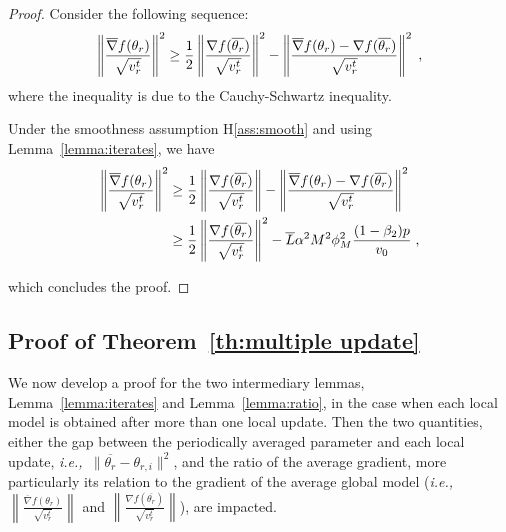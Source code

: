 \documentclass[11pt]{article}
\newcommand{\eqsp}{\;}
\newcommand{\beq}{\begin{equation}}
\newcommand{\eeq}{\end{equation}}
\newcommand{\ie}{{\em i.e.,~}}
\begin{document}
\begin{proof}
Consider the following sequence:
\beq\notag
\begin{split}
\left\| \frac{\overline{\nabla}f(\theta_r)}{\sqrt{ v_r^t}} \right\|^2 \geq \frac{1}{2} \left\| \frac{\nabla f(\overline{\theta_r})}{\sqrt{ v_r^t}} \right\|^2 - \left\| \frac{\overline{\nabla}f(\theta_r)- \nabla f(\overline{\theta_r})}{\sqrt{ v_r^t}} \right\|^2 \eqsp,
\end{split}
\eeq
where the inequality is due to the Cauchy-Schwartz inequality.

Under the smoothness assumption H\ref{ass:smooth} and using Lemma~\ref{lemma:iterates}, we have
\beq\notag
\begin{split}
\left\| \frac{\overline{\nabla}f(\theta_r)}{\sqrt{ v_r^t}} \right\|^2 & \geq \frac{1}{2} \left\| \frac{\nabla f(\overline{\theta_r})}{\sqrt{ v_r^t}} \right\| - \left\| \frac{\overline{\nabla}f(\theta_r)- \nabla f(\overline{\theta_r})}{\sqrt{ v_r^t}} \right\|^2\\
& \geq \frac{1}{2} \left\| \frac{\nabla f(\overline{\theta_r})}{\sqrt{ v_r^t}} \right\|^2 - \overline{L} \alpha^2 M^2 \phi_M^2 \frac{(1-\beta_2)p}{v_0} \eqsp,
\end{split}
\eeq

which concludes the proof.
\end{proof}



\subsection{Proof of Theorem~\ref{th:multiple update}} \label{app:proofmain}



We now develop a proof for the two intermediary lemmas, Lemma~\ref{lemma:iterates} and Lemma~\ref{lemma:ratio}, in the case when each local model is obtained after more than one local update.
Then the two quantities, either the gap between the periodically averaged parameter and each local update, \ie $\| \overline{\theta_r} - \theta_{r,i} \|^2$, and the ratio of the average gradient, more particularly its relation to the gradient of the average global model (\ie $\left\| \frac{\overline{\nabla}f(\theta_r)}{\sqrt{ v_r^t}} \right\|$ and $ \left\| \frac{\nabla f(\overline{\theta_r})}{\sqrt{ v_r^t}} \right\| $), are impacted.
\end{document}

